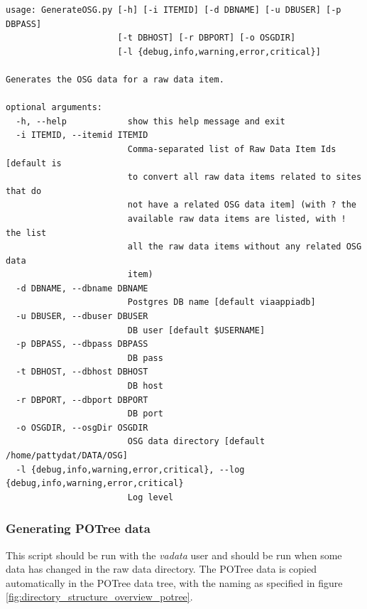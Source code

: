 \begin{Verbatim}[fontfamily=courier,commandchars=\\\{\},fontsize=\footnotesize]
 usage: GenerateOSG.py [-h] [-i ITEMID] [-d DBNAME] [-u DBUSER] [-p DBPASS]
                      [-t DBHOST] [-r DBPORT] [-o OSGDIR]
                      [-l {debug,info,warning,error,critical}]

Generates the OSG data for a raw data item.

optional arguments:
  -h, --help            show this help message and exit
  -i ITEMID, --itemid ITEMID
                        Comma-separated list of Raw Data Item Ids [default is
                        to convert all raw data items related to sites that do
                        not have a related OSG data item] (with ? the
                        available raw data items are listed, with ! the list
                        all the raw data items without any related OSG data
                        item)
  -d DBNAME, --dbname DBNAME
                        Postgres DB name [default viaappiadb]
  -u DBUSER, --dbuser DBUSER
                        DB user [default $USERNAME]
  -p DBPASS, --dbpass DBPASS
                        DB pass
  -t DBHOST, --dbhost DBHOST
                        DB host
  -r DBPORT, --dbport DBPORT
                        DB port
  -o OSGDIR, --osgDir OSGDIR
                        OSG data directory [default /home/pattydat/DATA/OSG]
  -l {debug,info,warning,error,critical}, --log {debug,info,warning,error,critical}
                        Log level
\end{Verbatim}

\subsubsection{Generating POTree data}
\label{sec:generatePOTree}
 This script should be run with the \textit{vadata} user and should be run when some data has changed in the raw data directory. The POTree data is copied automatically in the POTree data tree, with the naming as specified in figure \ref{fig:directory_structure_overview_potree}.

